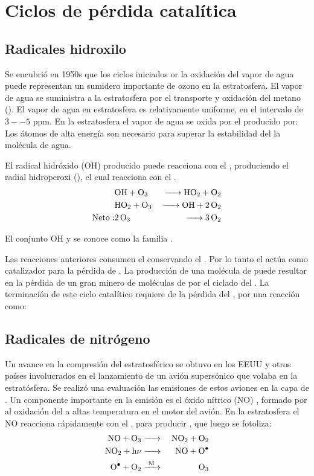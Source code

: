 \section[Ciclos de perdida catalitica]{Ciclos de pérdida catalítica}
\label{cpeoz}

\subsection{Radicales hidroxilo}
\label{roh}

Se encubrió en 1950s que los ciclos iniciados or la oxidación del vapor de agua puede representan un sumidero importante de ozono en la estratosfera. El vapor de agua se suministra a la estratosfera por el transporte y oxidación del metano (). El vapor de agua en estratosfera es relativamente uniforme, en el intervalo de $3--5$ ppm. En la estratosfera el vapor de agua se oxida por el  producido por:
Los átomos de alta energía  son necesario para superar la estabilidad del la molécula de agua.

El radical hidróxido (OH)  producido puede reacciona con el , produciendo el radial hidroperoxi (), el cual reacciona con el .
\begin{eqnarray*}
& \ce{OH + O3    & -> HO2 + O2 \\
      & HO2 +  O3   &-> OH + 2O2} \\
\mathrm{Neto: } &  \ce{2O3   &  ->  3O2}
\end{eqnarray*}

El conjunto OH y  se conoce como la familia .

Las reacciones anteriores consumen el  conservando el . Por lo tanto el  actúa como catalizador para la pérdida de . La producción de una molécula de  puede resultar en la pérdida de un gran minero de moléculas de  por el ciclado del . La terminación de este ciclo catalítico requiere de la pérdida del , por una reacción como:

\subsection{Radicales de nitrógeno}\label{rno3}
Un avance en la compresión del    estratosférico se obtuvo en los EEUU y otros países involucrados en el lanzamiento de un avión supersónico que volaba en la estratósfera.  Se realizó una evaluación las emisiones de estos aviones en la capa de .  Un componente importante en la emisión es el óxido nítrico (NO) , formado por al oxidación del  a altas temperatura en el motor del avión. En la estratosfera el NO reacciona rápidamente con el , para producir   , que luego se fotoliza:
\begin{eqnarray*}
 \ce{NO + O3       & -> &NO2 + O2 \\
  NO2 +  h$\nu$  &  -> &NO + O^. \\
   O^. + O2          &  ->[M] & O3}
\end{eqnarray*}


